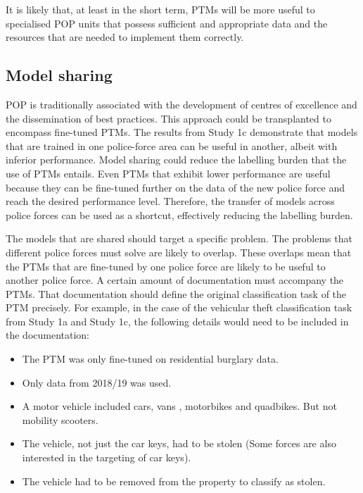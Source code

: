 It is likely that, at least in the short term, PTMs will be more useful to specialised POP units that possess sufficient and appropriate data and the resources that are needed to implement them correctly.

\subsection{Model sharing} POP is traditionally associated with the development of centres of excellence and the dissemination of best practices. This approach could be transplanted to encompass fine-tuned PTMs. The results from Study 1c demonstrate that models that are trained in one police-force area can be useful in another, albeit with inferior performance. Model sharing could reduce the labelling burden that the use of PTMs entails. Even PTMs that exhibit lower performance are useful because they can be fine-tuned further on the data of the new police force and reach the desired performance level. Therefore, the transfer of models across police forces can be used as a shortcut, effectively reducing the labelling burden.

The models that are shared should target a specific problem. The problems that different police forces must solve are likely to overlap. These overlaps mean that the PTMs that are fine-tuned by one police force are likely to be useful to another police force. A certain amount of documentation must accompany the PTMs. That documentation should define the original classification task of the PTM precisely. For example, in the case of the vehicular theft classification task from Study 1a and Study 1c, the following details would need to be included in the documentation:


\begin{itemize}

\item The PTM was only fine-tuned on residential burglary data.

\item Only data from 2018/19 was used.

\item A motor vehicle included cars, vans , motorbikes and quadbikes. But not mobility scooters.

\item The vehicle, not just the car keys, had to be stolen (Some forces are also interested in the targeting of car keys).

\item The vehicle had to be removed from the property to classify as stolen.

\end{itemize}

